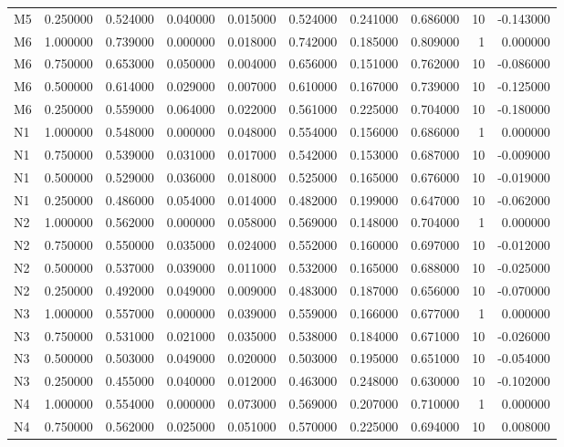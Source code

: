 \begin{table}
\begin{tabular}{lrrrrrrrrr}
M5 & 0.250000 & 0.524000 & 0.040000 & 0.015000 & 0.524000 & 0.241000 & 0.686000 & 10 & -0.143000 \\
M6 & 1.000000 & 0.739000 & 0.000000 & 0.018000 & 0.742000 & 0.185000 & 0.809000 & 1 & 0.000000 \\
M6 & 0.750000 & 0.653000 & 0.050000 & 0.004000 & 0.656000 & 0.151000 & 0.762000 & 10 & -0.086000 \\
M6 & 0.500000 & 0.614000 & 0.029000 & 0.007000 & 0.610000 & 0.167000 & 0.739000 & 10 & -0.125000 \\
M6 & 0.250000 & 0.559000 & 0.064000 & 0.022000 & 0.561000 & 0.225000 & 0.704000 & 10 & -0.180000 \\
N1 & 1.000000 & 0.548000 & 0.000000 & 0.048000 & 0.554000 & 0.156000 & 0.686000 & 1 & 0.000000 \\
N1 & 0.750000 & 0.539000 & 0.031000 & 0.017000 & 0.542000 & 0.153000 & 0.687000 & 10 & -0.009000 \\
N1 & 0.500000 & 0.529000 & 0.036000 & 0.018000 & 0.525000 & 0.165000 & 0.676000 & 10 & -0.019000 \\
N1 & 0.250000 & 0.486000 & 0.054000 & 0.014000 & 0.482000 & 0.199000 & 0.647000 & 10 & -0.062000 \\
N2 & 1.000000 & 0.562000 & 0.000000 & 0.058000 & 0.569000 & 0.148000 & 0.704000 & 1 & 0.000000 \\
N2 & 0.750000 & 0.550000 & 0.035000 & 0.024000 & 0.552000 & 0.160000 & 0.697000 & 10 & -0.012000 \\
N2 & 0.500000 & 0.537000 & 0.039000 & 0.011000 & 0.532000 & 0.165000 & 0.688000 & 10 & -0.025000 \\
N2 & 0.250000 & 0.492000 & 0.049000 & 0.009000 & 0.483000 & 0.187000 & 0.656000 & 10 & -0.070000 \\
N3 & 1.000000 & 0.557000 & 0.000000 & 0.039000 & 0.559000 & 0.166000 & 0.677000 & 1 & 0.000000 \\
N3 & 0.750000 & 0.531000 & 0.021000 & 0.035000 & 0.538000 & 0.184000 & 0.671000 & 10 & -0.026000 \\
N3 & 0.500000 & 0.503000 & 0.049000 & 0.020000 & 0.503000 & 0.195000 & 0.651000 & 10 & -0.054000 \\
N3 & 0.250000 & 0.455000 & 0.040000 & 0.012000 & 0.463000 & 0.248000 & 0.630000 & 10 & -0.102000 \\
N4 & 1.000000 & 0.554000 & 0.000000 & 0.073000 & 0.569000 & 0.207000 & 0.710000 & 1 & 0.000000 \\
N4 & 0.750000 & 0.562000 & 0.025000 & 0.051000 & 0.570000 & 0.225000 & 0.694000 & 10 & 0.008000 \\

\end{tabular}
\end{table}
